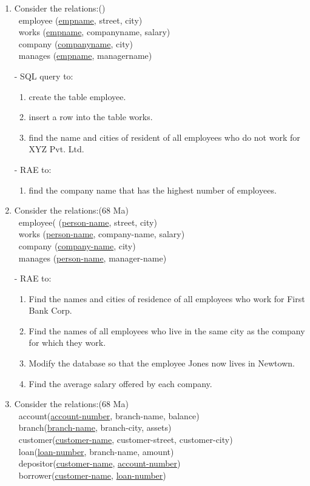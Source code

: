\documentclass[12pt]{article}
\newcommand{\enter}{\\\textcolor{white}{1}}
\begin{document}
\begin{enumerate}
    \item Consider the relations:\hfill()
        \enter employee (\underline{empname}, street, city)
        \enter works (\underline{empname}, companyname, salary)
        \enter company (\underline{companyname}, city)
        \enter manages (\underline{empname}, managername)

        - SQL query to:
        \begin{enumerate}[noitemsep, topsep = 0pt, label = \alph*.]
            \item create the table employee.
            \item insert a row into the table works.
            \item find the name and cities of resident of all employees who do not work for XYZ Pvt. Ltd.
        \end{enumerate}

        - RAE to:
        \begin{enumerate}[noitemsep, topsep = 0pt, label = \alph*.]
            \item find the company name that has the highest number of employees.
        \end{enumerate}

    \item Consider the relations:\hfill(68 Ma)
        \enter employee( (\underline{person-name}, street, city)
        \enter works (\underline{person-name}, company-name, salary)
        \enter company (\underline{company-name}, city)
        \enter manages (\underline{person-name}, manager-name)

        - RAE to:
        \begin{enumerate}[noitemsep, topsep = 0pt, label = \alph*.]
            \item Find the names and cities of residence of all employees who work for First Bank Corp.
            \item Find the names of all employees who live in the same city as the company for which they work.
            \item Modify the database so that the employee Jones now lives in Newtown.
            \item Find the average salary offered by each company.
        \end{enumerate}

    \item Consider the relations:\hfill(68 Ma)
        \enter account(\underline{account-number}, branch-name, balance)
        \enter branch(\underline{branch-name}, branch-city, assets)
        \enter customer(\underline{customer-name}, customer-street, customer-city)
        \enter loan(\underline{loan-number}, branch-name, amount)
        \enter depositor(\underline{customer-name}, \underline{account-number})
        \enter borrower(\underline{customer-name}, \underline{loan-number})


\end{enumerate}
\end{document}
